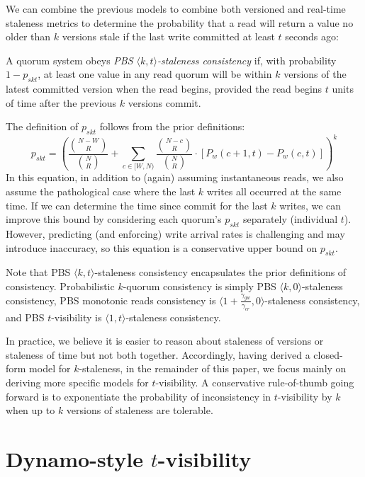 \documentclass{vldb}
\newcommand{\sectionskip}{-0em}
\begin{document}
We can combine the previous models to combine both versioned and
real-time staleness metrics to determine the probability that a read
will return a value no older than $k$ versions stale if the last write
committed at least $t$ seconds ago:
\begin{definition}
A quorum system obeys \textit{PBS $\langle k, t \rangle$-staleness
  consistency} if, with probability $1-p_{skt}$, at least one value in
any read quorum will be within $k$ versions of the latest committed
version when the read begins, provided the read begins $t$ units of
time after the previous $k$ versions commit.
\end{definition}
The definition of $p_{skt}$ follows from the prior definitions:
\begin{equation}
p_{skt} = (\frac{{N-W \choose R}}{{N \choose R}}+\sum_{c\in[W, N)} \frac{{N-c \choose R}}{{N \choose R}} \cdot [P_w(c+1, t)-P_w(c,t)])^k
\end{equation}
In this equation, in addition to (again) assuming instantaneous reads,
we also assume the pathological case where the last $k$ writes all
occurred at the same time.  If we can determine the time since commit
for the last $k$ writes, we can improve this bound by considering each
quorum's $p_{skt}$ separately (individual $t$).  However, predicting
(and enforcing) write arrival rates is challenging and may introduce
inaccuracy, so this equation is a conservative upper bound on
$p_{skt}$.

Note that PBS $\langle k, t \rangle$-staleness consistency
encapsulates the prior definitions of consistency. Probabilistic
$k$-quorum consistency is simply PBS $\langle k, 0 \rangle$-staleness
consistency, PBS monotonic reads consistency is $\langle
1+\frac{\gamma_{gw}}{\gamma_{cr}}, 0 \rangle$-staleness consistency,
and PBS $t$-visibility is $\langle 1, t \rangle$-staleness
consistency.

In practice, we believe it is easier to reason about staleness of
versions or staleness of time but not both together.  Accordingly,
having derived a closed-form model for $k$-staleness, in the remainder
of this paper, we focus mainly on deriving more specific models for
$t$-visibility. A conservative rule-of-thumb going forward is to
exponentiate the probability of inconsistency in $t$-visibility by $k$
when up to $k$ versions of staleness are tolerable.

\vspace{\sectionskip}\section{Dynamo-style $t$-visibility}
\label{sec:dynamo}
\end{document}
